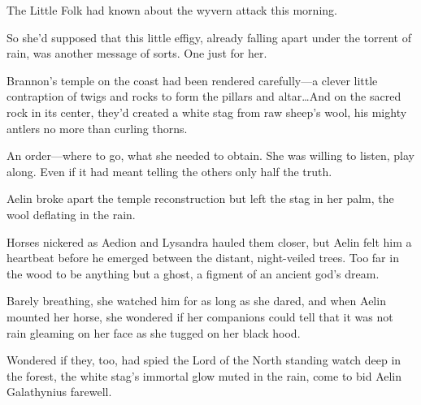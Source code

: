 The Little Folk had known about the wyvern attack this morning.

So she'd supposed that this little effigy, already falling apart under the torrent of rain, was another message of sorts.
One just for her.

Brannon's temple on the coast had been rendered carefully---a clever little contraption of twigs and rocks to form the pillars and altar\ldots And on the sacred rock in its center, they'd created a white stag from raw sheep's wool, his mighty antlers no more than curling thorns.

An order---where to go, what she needed to obtain.
She was willing to listen, play along.
Even if it had meant telling the others only half the truth.

Aelin broke apart the temple reconstruction but left the stag in her palm, the wool deflating in the rain.

Horses nickered as Aedion and Lysandra hauled them closer, but Aelin felt him a heartbeat before he emerged between the distant, night-veiled trees.
Too far in the wood to be anything but a ghost, a figment of an ancient god's dream.

Barely breathing, she watched him for as long as she dared, and when Aelin mounted her horse, she wondered if her companions could tell that it was not rain gleaming on her face as she tugged on her black hood.

Wondered if they, too, had spied the Lord of the North standing watch deep in the forest, the white stag's immortal glow muted in the rain, come to bid Aelin Galathynius farewell.
